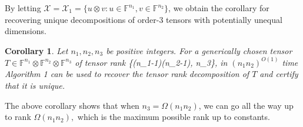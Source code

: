 \documentclass[11pt]{article}
\newtheorem{cor}[theorem]{Corollary}
\theoremstyle{definition}
\newcommand{\field}{\mathbb{F}}
\newcommand\X{\mathcal{X}}
\newcommand\W{\mathcal{W}}
\newcommand\V{\mathcal{V}}
\DeclareMathOperator{\spn}{span}
\newcommand{\anote}[1]{}
\def\ba#1\ea{\begin{align}#1\end{align}}
\begin{document}


%
By letting $\X=\X_1=\{u \otimes v : u \in \field^{n_1}, v \in \field^{n_2}\}$, we obtain the corollary for recovering unique decompositions of order-$3$ tensors with potentially unequal dimensions.
\begin{cor}\label{cor:tensor_decomp}
Let $n_1,n_2,n_3$ be positive integers. For a generically chosen tensor $T \in \field^{n_1}\otimes \field^{n_2} \otimes \field^{n_3}$ of tensor rank
\ba
R \leq \min\Bigg\{(n_1-1)(n_2-1), n_3\Bigg\},
\ea
in $(n_1 n_2)^{O(1)}$ time Algorithm 1 can be used to recover the tensor rank decomposition of $T$ and certify that it is unique.
\end{cor}
The above corollary shows that when $n_3 =\Omega(n_1 n_2)$, we can go all the way up to rank $\Omega(n_1 n_2),$ which is the maximum possible rank up to constants.
\end{document}
